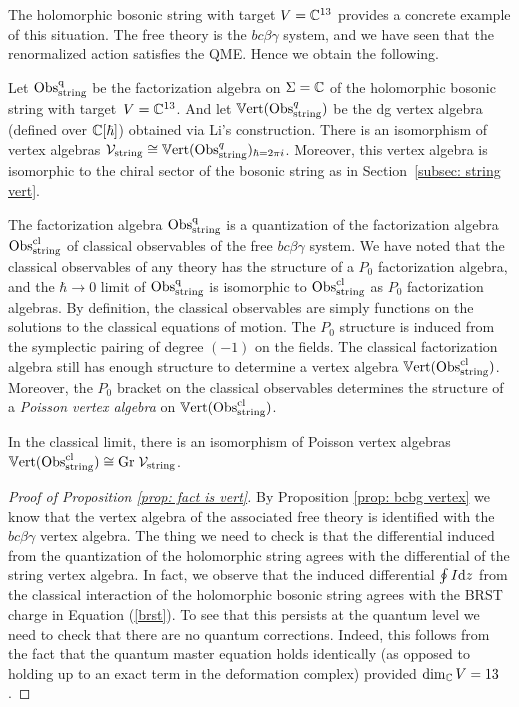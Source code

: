 The holomorphic bosonic string with target $V=\mathbb C^{13}$ provides a concrete example of this situation.
The free theory is the $bc\beta\gamma$ system, 
and we have seen that the renormalized action satisfies the QME.
Hence we obtain the following.

\begin{prop} \label{prop: fact is vert}
Let ${\rm Obs}^{\rm q}_{\rm string}$ be the factorization algebra on $\Sigma = \mathbb C$ of the holomorphic bosonic string with target~$V = \mathbb C^{13}$. And let $\mathbb{V}{\rm ert}({\rm Obs}^q_{\rm string})$ be the dg vertex algebra (defined over $\mathbb C[\hbar]$) obtained via Li's construction. 
There is an isomorphism of vertex algebras $\mathcal{V}_{\rm string} \cong \mathbb{V}{\rm ert}({\rm Obs}^q_{\rm string})_{\hbar = 2 \pi i}$.
Moreover, this vertex algebra is isomorphic to the chiral sector of the bosonic string as in Section~\ref{subsec: string vert}.
\end{prop}

The factorization algebra ${\rm Obs}^{\rm q}_{\rm string}$ is a quantization of the factorization algebra ${\rm Obs}^{{\rm cl}}_{\rm string}$ of classical observables of the free $bc\beta\gamma$ system.
We have noted that the classical observables of any theory has the structure of a $P_0$ factorization algebra, and the $\hbar \to 0$ limit of ${\rm Obs}^{\rm q}_{\rm string}$ is isomorphic to ${\rm Obs}^{{\rm cl}}_{\rm string}$ as $P_0$ factorization algebras.
By definition, the classical observables are simply functions on the solutions to the classical equations of motion.
The $P_0$ structure is induced from the symplectic pairing of degree $(-1)$ on the fields. 
The classical factorization algebra still has enough structure to determine a vertex algebra $\mathbb{V}{\rm ert}({\rm Obs}^{\rm cl}_{\rm string})$.
Moreover, the $P_0$ bracket on the classical observables determines the structure of a {\em Poisson vertex algebra} on $\mathbb{V}{\rm ert}({\rm Obs}^{{\rm cl}}_{\rm string})$. 

\begin{cor} In the classical limit, there is an isomorphism of Poisson vertex algebras~$\mathbb{V}{\rm ert}({\rm Obs}^{{\rm cl}}_{\rm string}) \cong {\rm Gr} \; \mathcal{V}_{\rm string}$.
\end{cor}

\begin{proof}[Proof of Proposition \ref{prop: fact is vert}] By Proposition \ref{prop: bcbg vertex} we know that the vertex algebra of the associated free theory is identified with the $bc\beta\gamma$ vertex algebra. 
The thing we need to check is that the differential induced from the quantization of the holomorphic string agrees with the differential of the string vertex algebra. 
In fact, we observe that the induced differential $\oint I {\rm d} z$ from the classical interaction of the holomorphic bosonic string agrees with the BRST charge in Equation (\ref{brst}). 
To see that this persists at the quantum level we need to check that there are no quantum corrections. 
Indeed, this follows from the fact that the quantum master equation holds identically (as opposed to holding up to an exact term in the deformation complex) provided $\dim_\mathbb C V = 13$. 
\end{proof}

